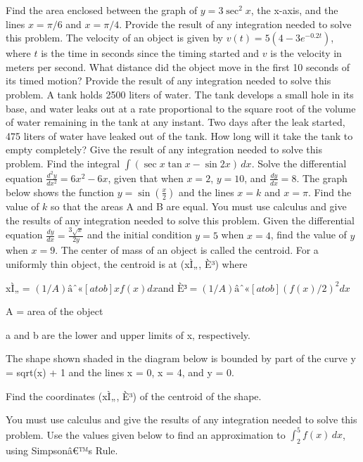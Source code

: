 \documentclass[12pt,addpoints]{exam}
\begin{document}
\begin{questions}
\fillwithlines{5cm}
\question[5] Find the area enclosed between the graph of \(y = 3 \sec^2 x\), the x-axis, and the lines \(x = \pi/6\) and \(x = \pi/4\). Provide the result of any integration needed to solve this problem.
\fillwithlines{5cm}
\question[5] The velocity of an object is given by \(v(t) = 5(4 - 3e^{-0.2t})\), where \(t\) is the time in seconds since the timing started and \(v\) is the velocity in meters per second. What distance did the object move in the first 10 seconds of its timed motion? Provide the result of any integration needed to solve this problem.
\fillwithlines{5cm}
\question[5] A tank holds 2500 liters of water. The tank develops a small hole in its base, and water leaks out at a rate proportional to the square root of the volume of water remaining in the tank at any instant. Two days after the leak started, 475 liters of water have leaked out of the tank. How long will it take the tank to empty completely? Give the result of any integration needed to solve this problem.
\fillwithlines{5cm}
\question[5] Find the integral \(\int (\sec x \tan x - \sin 2x) \, dx\).
\fillwithlines{5cm}
\question[5] Solve the differential equation \(\frac{d^2 y}{dx^2} = 6x^2 - 6x\), given that when \(x = 2\), \(y = 10\), and \(\frac{dy}{dx} = 8\).
\fillwithlines{5cm}
\question[5] The graph below shows the function \( y = \sin \left( \frac{x}{2} \right) \) and the lines \( x = k \) and \( x = \pi \). Find the value of \( k \) so that the areas A and B are equal. You must use calculus and give the results of any integration needed to solve this problem.
\fillwithlines{5cm}
\question[5] Given the differential equation \(\frac{dy}{dx} = \frac{3\sqrt{x}}{2y}\) and the initial condition \(y = 5\) when \(x = 4\), find the value of \(y\) when \(x = 9\).
\fillwithlines{5cm}
\question[5] The center of mass of an object is called the centroid. For a uniformly thin object, the centroid is at (xÌ„, È³) where

xÌ„ = \((1/A) âˆ«[a to b] x f(x) dx \)and \(È³ = (1/A) âˆ«[a to b] (f(x)/2)^2 dx\)

A = area of the object

a and b are the lower and upper limits of x, respectively.

The shape shown shaded in the diagram below is bounded by part of the curve y = sqrt(x) + 1 and the lines x = 0, x = 4, and y = 0.

Find the coordinates (xÌ„, È³) of the centroid of the shape.

You must use calculus and give the results of any integration needed to solve this problem.
\fillwithlines{5cm}
\question[5] Use the values given below to find an approximation to \(\int_{2}^{5} f(x) \, dx\), using Simpsonâ€™s Rule.


\end{questions}
\end{document}
